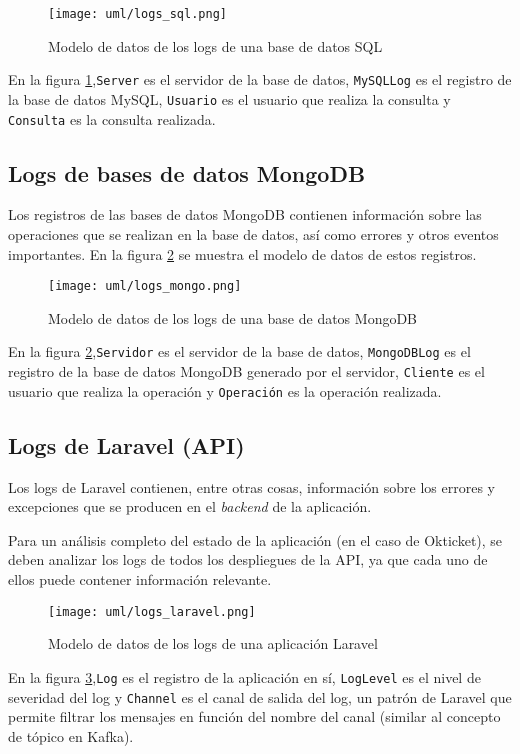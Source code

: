 \begin{figure}[H]
	\centering
	\texttt{[image: uml/logs\_sql.png]}
	\caption{Modelo de datos de los logs de una base de datos SQL}
	\label{fig:logs_sql}
\end{figure}

En la figura \ref{fig:logs_sql},\texttt{Server} es el servidor de la base de
datos, \texttt{MySQLLog} es el registro de la base de datos MySQL,
\texttt{Usuario} es el usuario que realiza la consulta y \texttt{Consulta} es la
consulta realizada.


\newpage{}
\subsection{Logs de bases de datos MongoDB}
Los registros de las bases de datos MongoDB contienen información sobre las
operaciones que se realizan en la base de datos, así como errores y otros
eventos importantes. En la figura \ref{fig:logs_mongo} se muestra el modelo de
datos de estos registros.

\begin{figure}[H]
	\centering
	\texttt{[image: uml/logs\_mongo.png]}
	\caption{Modelo de datos de los logs de una base de datos MongoDB}
	\label{fig:logs_mongo}
\end{figure}

En la figura \ref{fig:logs_mongo},\texttt{Servidor} es el servidor de la base de
datos, \texttt{MongoDBLog} es el registro de la base de datos MongoDB generado
por el servidor, \texttt{Cliente} es el usuario que realiza la operación y
\texttt{Operación} es la operación realizada.


\newpage{}
\subsection{Logs de Laravel (API)}
Los logs de Laravel contienen, entre otras cosas, información sobre los
errores y excepciones que se producen en el \textit{backend} de la
aplicación.

Para un análisis completo del estado de la aplicación (en el caso de
Okticket), se deben analizar los logs de todos los despliegues de la
API, ya que cada uno de ellos puede contener información relevante.

\begin{figure}[H]
	\centering
	\texttt{[image: uml/logs\_laravel.png]}
	\caption{Modelo de datos de los logs de una aplicación Laravel}
	\label{fig:logs_laravel}
\end{figure}

En la figura \ref{fig:logs_laravel},\texttt{Log} es el registro de la aplicación
en sí, \texttt{LogLevel} es el nivel de severidad del log y \texttt{Channel} es
el canal de salida del log, un patrón de Laravel que permite filtrar los
mensajes en función del nombre del canal (similar al concepto de tópico en
Kafka).
